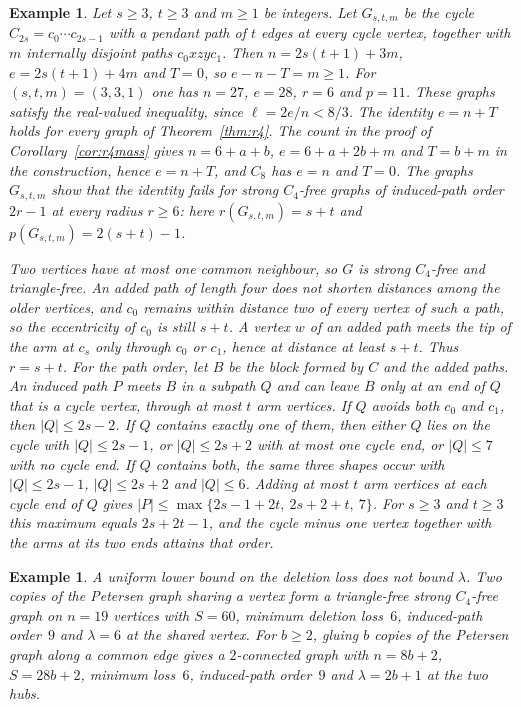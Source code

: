 \documentclass[ASNA]{USG}
\theoremstyle{WBstyletwo}
\newtheorem{example}[theorem]{Example}
\numberwithin{equation}{section}
\newcommand{\lr}{\ell}
\newcommand{\pp}{p}
\begin{document}
\begin{example}\label{ex:radstar}
Let $s\ge 3$, $t\ge 3$ and $m\ge 1$ be integers. Let $G_{s,t,m}$ be the cycle $C_{2s}=c_0\cdots c_{2s-1}$ with a pendant path of $t$ edges at every cycle vertex, together with $m$ internally disjoint paths $c_0xzyc_1$. Then $n=2s(t+1)+3m$, $e=2s(t+1)+4m$ and $T=0$, so $e-n-T=m\ge 1$. For $(s,t,m)=(3,3,1)$ one has $n=27$, $e=28$, $r=6$ and $\pp=11$. These graphs satisfy the real-valued inequality, since $\lr=2e/n<8/3$. The identity $e=n+T$ holds for every graph of Theorem~\ref{thm:r4}. The count in the proof of Corollary~\ref{cor:r4mass} gives $n=6+a+b$, $e=6+a+2b+m$ and $T=b+m$ in the construction, hence $e=n+T$, and $C_8$ has $e=n$ and $T=0$. The graphs $G_{s,t,m}$ show that the identity fails for strong $C_4$-free graphs of induced-path order $2r-1$ at every radius $r\ge 6$: here $r(G_{s,t,m})=s+t$ and $\pp(G_{s,t,m})=2(s+t)-1$.

Two vertices have at most one common neighbour, so $G$ is strong $C_4$-free and triangle-free. An added path of length four does not shorten distances among the older vertices, and $c_0$ remains within distance two of every vertex of such a path, so the eccentricity of $c_0$ is still $s+t$. A vertex $w$ of an added path meets the tip of the arm at $c_s$ only through $c_0$ or $c_1$, hence at distance at least $s+t$. Thus $r=s+t$. For the path order, let $B$ be the block formed by $C$ and the added paths. An induced path $P$ meets $B$ in a subpath $Q$ and can leave $B$ only at an end of $Q$ that is a cycle vertex, through at most $t$ arm vertices. If $Q$ avoids both $c_0$ and $c_1$, then $|Q|\le 2s-2$. If $Q$ contains exactly one of them, then either $Q$ lies on the cycle with $|Q|\le 2s-1$, or $|Q|\le 2s+2$ with at most one cycle end, or $|Q|\le 7$ with no cycle end. If $Q$ contains both, the same three shapes occur with $|Q|\le 2s-1$, $|Q|\le 2s+2$ and $|Q|\le 6$. Adding at most $t$ arm vertices at each cycle end of $Q$ gives $|P|\le\max\{2s-1+2t,\ 2s+2+t,\ 7\}$. For $s\ge 3$ and $t\ge 3$ this maximum equals $2s+2t-1$, and the cycle minus one vertex together with the arms at its two ends attains that order.
\end{example}

\begin{example}\label{ex:star5}
A uniform lower bound on the deletion loss does not bound $\lambda$. Two copies of the Petersen graph sharing a vertex form a triangle-free strong $C_4$-free graph on $n=19$ vertices with $S=60$, minimum deletion loss~$6$, induced-path order~$9$ and $\lambda=6$ at the shared vertex. For $b\ge 2$, gluing $b$ copies of the Petersen graph along a common edge gives a $2$-connected graph with $n=8b+2$, $S=28b+2$, minimum loss~$6$, induced-path order~$9$ and $\lambda=2b+1$ at the two hubs.
\end{example}
\end{document}
